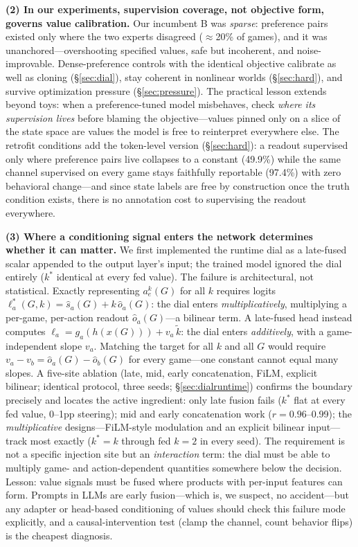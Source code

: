 \documentclass[11pt]{article}
\begin{document}
\textbf{(2) In our experiments, supervision coverage, not objective form, governs value
calibration.} Our incumbent
B was \emph{sparse}: preference pairs existed only where the two experts disagreed
($\approx$20\% of games), and it was unanchored---overshooting specified values, safe but
incoherent, and noise-improvable. Dense-preference controls with the identical objective
calibrate as well as cloning (\S\ref{sec:dial}), stay coherent in nonlinear worlds
(\S\ref{sec:hard}), and survive optimization pressure (\S\ref{sec:pressure}). The practical
lesson extends beyond toys: when a preference-tuned model misbehaves, check \emph{where its
supervision lives} before blaming the objective---values pinned only on a slice of the state
space are values the model is free to reinterpret everywhere else. The retrofit conditions add
the token-level version (\S\ref{sec:hard}): a readout supervised only where preference pairs
live collapses to a constant (49.9\%) while the same channel supervised on every game stays
faithfully reportable (97.4\%) with zero behavioral change---and since state labels are free by
construction once the truth condition exists, there is no annotation cost to supervising the
readout everywhere.

\textbf{(3) Where a conditioning signal enters the network determines whether it can matter.}
We first implemented the runtime dial as a late-fused scalar appended to the output layer's
input; the trained model ignored the dial entirely ($k^*$ identical at every fed value). The
failure is architectural, not statistical. Exactly representing $a^{k}_{e}(G)$ for all $k$
requires logits $\ell^{*}_{a}(G, k) = \hat{s}_a(G) + k\,\hat{o}_a(G)$: the dial enters
\emph{multiplicatively}, multiplying a per-game, per-action readout $\hat{o}_a(G)$---a bilinear
term. A late-fused head instead computes $\ell_a = g_a(h(x(G))) + v_a\,\tilde{k}$: the dial
enters \emph{additively}, with a game-independent slope $v_a$. Matching the target for all $k$
and all $G$ would require $v_a - v_b = \hat{o}_a(G) - \hat{o}_b(G)$ for every game---one constant
cannot equal many slopes. A five-site ablation (late, mid, early concatenation, FiLM, explicit
bilinear; identical protocol, three seeds; \S\ref{sec:dialruntime}) confirms the boundary
precisely and locates the active ingredient: only late fusion fails ($k^*$ flat at every fed
value, 0--1pp steering); mid and early concatenation work ($r{=}0.96$--0.99); the
\emph{multiplicative} designs---FiLM-style modulation and an explicit bilinear input---track
most exactly ($k^*{=}k$ through fed $k{=}2$ in every seed). The requirement is not a specific
injection site but an \emph{interaction} term: the dial must be able to multiply game- and
action-dependent quantities somewhere below the decision. Lesson: value signals must be fused
where products with per-input features can form. Prompts in LLMs are early
fusion---which is, we suspect, no accident---but any adapter or head-based conditioning of
values should check this failure mode explicitly, and a causal-intervention test (clamp the
channel, count behavior flips) is the cheapest diagnosis.
\end{document}
